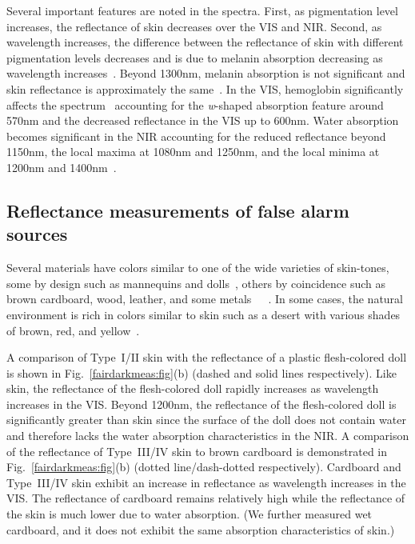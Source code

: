 \documentclass[10pt,journal,cspaper,compsoc]{IEEEtran}
\begin{document}
Several important features are noted in the spectra. First, as pigmentation level increases, the reflectance of skin decreases over the VIS and NIR.  
Second, as wavelength increases, the difference between the reflectance of skin with different pigmentation levels decreases and is due to melanin
absorption decreasing as wavelength increases~\cite{Jacques1}.  Beyond 1300nm, melanin absorption is not significant and skin reflectance is 
approximately the same~\cite{Anderson1}. In the VIS, hemoglobin significantly affects the spectrum~\cite{Kollias1} accounting for the 
\emph{w}-shaped absorption feature around 570nm and the decreased reflectance in the VIS up to 600nm. Water absorption becomes significant 
in the NIR accounting for the reduced reflectance beyond 1150nm, the local maxima at 1080nm and 1250nm, and the local minima at 1200nm and 1400nm~\cite{Anderson1}.

\subsection{Reflectance measurements of false alarm sources}
Several materials have colors similar to one of the wide varieties of skin-tones, some by design such as mannequins and 
dolls~\cite{Angelopoulou2}, others by coincidence such as brown cardboard, wood, leather, and some 
metals~\cite{Storring3}~\cite{Jones1}~\cite{Abdel1}.  In some cases, the natural environment is rich in colors similar to skin 
such as a desert with various shades of brown, red, and yellow~\cite{Wang2}.

A comparison of Type~I/II skin with the reflectance of a plastic flesh-colored doll is shown in Fig.~\ref{fairdarkmeas:fig}(b) (dashed and 
solid lines respectively).  Like skin, the reflectance of the flesh-colored doll rapidly increases as wavelength increases in the VIS.  
Beyond 1200nm, the reflectance of the flesh-colored doll is significantly greater than skin since the surface of the doll does 
not contain water and therefore lacks the water absorption characteristics in the NIR.  A comparison of the reflectance of Type~III/IV 
skin to brown cardboard is demonstrated in Fig.~\ref{fairdarkmeas:fig}(b) (dotted line/dash-dotted respectively).  Cardboard and Type~III/IV 
skin exhibit an increase in reflectance as wavelength increases in the VIS. The reflectance of cardboard remains relatively high while 
the reflectance of the skin is much lower due to water absorption. (We further measured wet cardboard, and it does not exhibit 
the same absorption characteristics of skin.)
\end{document}
